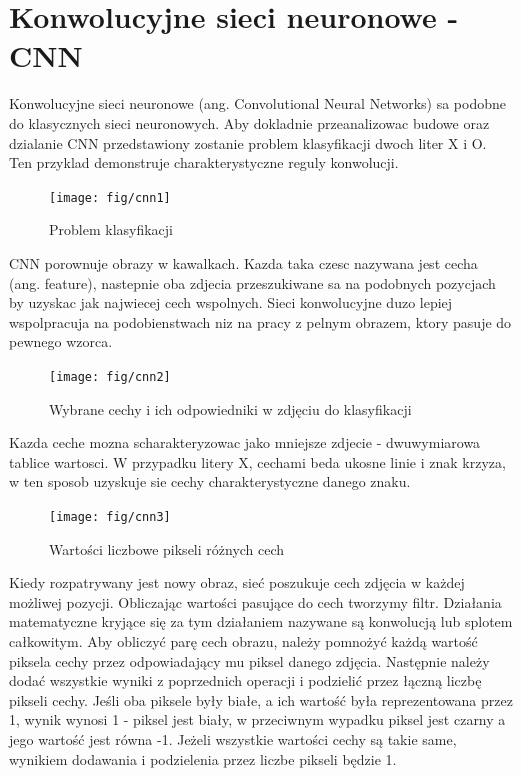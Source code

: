 \documentclass[brudnopis]{xmgr}
\begin{document}
\section{Konwolucyjne sieci neuronowe - CNN}

Konwolucyjne sieci neuronowe (ang. Convolutional Neural Networks) sa podobne do klasycznych sieci neuronowych. Aby dokladnie przeanalizowac budowe oraz dzialanie CNN przedstawiony zostanie problem klasyfikacji dwoch liter X i O. Ten przyklad demonstruje charakterystyczne reguly konwolucji.

\begin{figure}[!tbh]
\centering
\texttt{[image: fig/cnn1]}
\caption{Problem klasyfikacji}
\end{figure}
CNN porownuje obrazy w kawalkach. Kazda taka czesc nazywana jest cecha (ang. feature), nastepnie oba zdjecia przeszukiwane sa na podobnych pozycjach by uzyskac jak najwiecej cech wspolnych. Sieci konwolucyjne duzo lepiej wspolpracuja na podobienstwach niz na pracy z pelnym obrazem, ktory pasuje do pewnego wzorca.
\newpage

\begin{figure}[!tbh]
\centering
\texttt{[image: fig/cnn2]}
\caption{Wybrane cechy i ich odpowiedniki w zdjęciu do klasyfikacji}
\end{figure}

Kazda ceche mozna scharakteryzowac jako mniejsze zdjecie - dwuwymiarowa tablice wartosci. W przypadku litery X, cechami beda ukosne linie i znak krzyza, w ten sposob uzyskuje sie cechy charakterystyczne danego znaku.

\begin{figure}[!tbh]
\centering
\texttt{[image: fig/cnn3]}
\caption{Wartości liczbowe pikseli różnych cech}
\end{figure}
\newpage

Kiedy rozpatrywany jest nowy obraz, sieć poszukuje cech zdjęcia w każdej możliwej pozycji. Obliczając wartości pasujące do cech  tworzymy filtr. Działania matematyczne kryjące się za tym działaniem nazywane są konwolucją lub splotem całkowitym. Aby obliczyć parę cech obrazu, należy pomnożyć każdą wartość piksela cechy przez odpowiadający mu piksel danego zdjęcia. Następnie należy dodać wszystkie wyniki z poprzednich operacji i podzielić przez łączną liczbę pikseli cechy. Jeśli oba piksele były białe, a ich wartość była reprezentowana przez 1, wynik wynosi 1 - piksel jest biały, w przeciwnym wypadku piksel jest czarny a jego wartość jest równa -1. Jeżeli wszystkie wartości cechy są takie same, wynikiem dodawania i podzielenia przez liczbe pikseli będzie 1.
\end{document}
